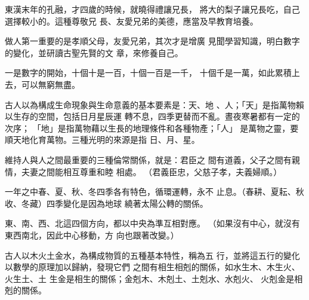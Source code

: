 \documentclass[avery5371,grid]{flashcards}
\begin{document}
{東漢末年的孔融，才四歲的時候，就曉得禮讓兄長，
將大的梨子讓兄長吃，自己選擇較小的。這種尊敬兄
長、友愛兄弟的美德，應當及早教育培養。} %
{} %





{做人第一重要的是孝順父母，友愛兄弟，其次才是增廣
見聞學習知識，明白數字的變化，並研讀古聖先賢的文
章，來修養自己。} %
{} %



{一是數字的開始，十個十是一百，十個一百是一千，
十個千是一萬，如此累積上去，可以無窮無盡。} %
{} %



{古人以為構成生命現象與生命意義的基本要素是：天、地
、人；「天」是指萬物賴以生存的空間，包括日月星辰運
轉不息，四季更替而不亂。晝夜寒暑都有一定的次序；
「地」是指萬物藉以生長的地理條件和各種物產；「人」
是萬物之靈，要順天地化育萬物。三種光明的來源是指
日、月、星。} %
{} %



{維持人與人之間最重要的三種倫常關係，就是：君臣之
間有道義，父子之間有親情，夫妻之間能相互尊重和睦
相處。} %
{（君義臣忠，父慈子孝，夫義婦順。）} %



{一年之中春、夏、秋、冬四季各有特色，循環運轉，永不
止息。（春耕、夏耘、秋收、冬藏）四季變化是因為地球
繞著太陽公轉的關係。} %
{} %



{東、南、西、北這四個方向，都以中央為準互相對應。} %
{（如果沒有中心，就沒有東西南北，因此中心移動，方
向也跟著改變。）} %



{古人以木火土金水，為構成物質的五種基本特性，稱為五
行，並將這五行的變化以數學的原理加以歸納，發現它們
之間有相生相剋的關係，如水生木、木生火、火生土、土
生金是相生的關係；金剋木、木剋土、土剋水、水剋火、
火剋金是相剋的關係。} %
{} %
\end{document}
